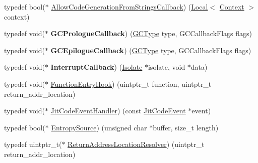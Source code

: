 \begin{DoxyCompactItemize}
\item 
typedef bool($\ast$ \hyperlink{namespacev8_a521d909ec201742a1cb35d50a8e2a3c2}{Allow\+Code\+Generation\+From\+Strings\+Callback}) (\hyperlink{classv8_1_1Local}{Local}$<$ \hyperlink{classv8_1_1Context}{Context} $>$ context)
\item 
\hypertarget{namespacev8_a09e509ff7a94ad074420980c5f5762af}{}typedef void($\ast$ {\bfseries G\+C\+Prologue\+Callback}) (\hyperlink{namespacev8_ac109d6f27e0c0f9ef4e98bcf7a806cf2}{G\+C\+Type} type, G\+C\+Callback\+Flags flags)\label{namespacev8_a09e509ff7a94ad074420980c5f5762af}

\item 
\hypertarget{namespacev8_a4a818ae1aee0cb378a4c2037dfc4a4c2}{}typedef void($\ast$ {\bfseries G\+C\+Epilogue\+Callback}) (\hyperlink{namespacev8_ac109d6f27e0c0f9ef4e98bcf7a806cf2}{G\+C\+Type} type, G\+C\+Callback\+Flags flags)\label{namespacev8_a4a818ae1aee0cb378a4c2037dfc4a4c2}

\item 
\hypertarget{namespacev8_af07fcf2ef61237b7ba67242700b6a875}{}typedef void($\ast$ {\bfseries Interrupt\+Callback}) (\hyperlink{classv8_1_1Isolate}{Isolate} $\ast$isolate, void $\ast$data)\label{namespacev8_af07fcf2ef61237b7ba67242700b6a875}

\item 
typedef void($\ast$ \hyperlink{namespacev8_aaf07fb6bb13f295da3c6568938b7dec5}{Function\+Entry\+Hook}) (uintptr\+\_\+t function, uintptr\+\_\+t return\+\_\+addr\+\_\+location)
\item 
typedef void($\ast$ \hyperlink{namespacev8_a39243bc91e63d64d111452fdb98c4733}{Jit\+Code\+Event\+Handler}) (const \hyperlink{structv8_1_1JitCodeEvent}{Jit\+Code\+Event} $\ast$event)
\item 
typedef bool($\ast$ \hyperlink{namespacev8_ab699f4bbbb56350e6e915682e420fcdc}{Entropy\+Source}) (unsigned char $\ast$buffer, size\+\_\+t length)
\item 
typedef uintptr\+\_\+t($\ast$ \hyperlink{namespacev8_a8ce54c75241be41ff6a25e9944eefd2a}{Return\+Address\+Location\+Resolver}) (uintptr\+\_\+t return\+\_\+addr\+\_\+location)
\end{DoxyCompactItemize}

